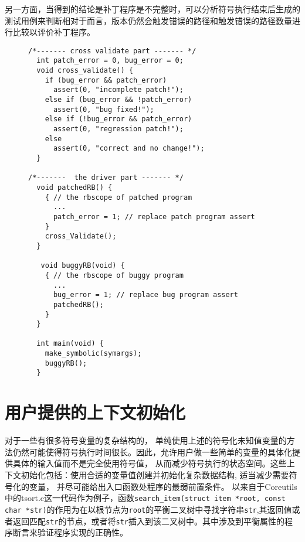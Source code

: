 另一方面，当得到的结论是补丁程序是不完整时，可以分析符号执行结束后生成的测试用例来判断相对于\bug 而言，\patch 版本仍然会触发错误的路径和\bug 触发错误的路径数量进行比较以评价补丁程序。

\begin{figure}[t]
\begin{center}
\begin{lstlisting}[language={[ANSI]C}]
/*------- cross validate part ------- */
  int patch_error = 0, bug_error = 0;
  void cross_validate() {
    if (bug_error && patch_error)
      assert(0, "incomplete patch!");
    else if (bug_error && !patch_error)
      assert(0, "bug fixed!");
    else if (!bug_error && patch_error)
      assert(0, "regression patch!");
    else
      assert(0, "correct and no change!");
  }

/*-------  the driver part ------- */
  void patchedRB() {
    { // the rbscope of patched program
      ...
      patch_error = 1; // replace patch program assert
    }
    cross_Validate();
  }

   void buggyRB(void) {
    { // the rbscope of buggy program
      ...
      bug_error = 1; // replace bug program assert
      patchedRB();
    }
  }

  int main(void) {
    make_symbolic(symargs);
    buggyRB();
  }

\end{lstlisting}
\vspace{-0.5cm}
\end{center}
\end{figure}

\section{用户提供的上下文初始化}
\label{sec:user_init}

对于一些有很多符号变量的复杂结构的\rbscope ， 单纯使用上述的符号化未知值变量的方法仍然可能使得符号执行时间很长。因此，\dryrun 允许用户做一些简单的变量的具体化\cndash 提供具体的输入值而不是完全使用符号值， 从而减少符号执行的状态空间。这些上下文初始化包括：使用合适的变量值创建并初始化复杂数据结构, 适当减少需要符号化的变量， 并尽可能给出入口函数处程序的最弱前置条件。
以来自于Coreutils中的tsort.c这一代码作为例子，函数\texttt{search\_item(struct item *root, const char *str)}的作用为在以根节点为\texttt{\textmd{root}}的平衡二叉树中寻找字符串\texttt{\textmd{str}},其返回值或者返回匹配\texttt{\textmd{str}}的节点，或者将\texttt{\textmd{str}}插入到该二叉树中。其中涉及到平衡属性的程序断言来验证程序实现的正确性。

